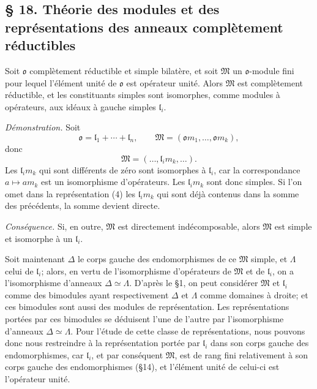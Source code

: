 
\providecommand{\mo}{\mathfrak{o}}
\providecommand{\mM}{\mathfrak{M}}
\providecommand{\ml}{\mathfrak{l}}

\subsection*{\S{} 18. Théorie des modules et des représentations des anneaux complètement réductibles}
Soit $\mo$ complètement réductible et simple bilatère, et soit $\mM$ un $\mo$-module fini pour lequel l'élément unité de $\mo$ est opérateur unité. Alors $\mM$ est complètement réductible, et les constituants simples sont isomorphes, comme modules à opérateurs, aux idéaux à gauche simples $\ml_i$.

\emph{Démonstration.} Soit
\[
        \mo=\ml_1+\cdots+\ml_n,
        \qquad
        \mM=(\mo m_1,\ldots,\mo m_k),
\]
donc
\[
        \mM=(\ldots,\ml_i m_k,\ldots).                     \tag{4}
\]
Les $\ml_i m_k$ qui sont différents de zéro sont isomorphes à $\ml_i$, car la correspondance $a\mapsto am_k$ est un isomorphisme d'opérateurs. Les $\ml_i m_k$ sont donc simples. Si l'on omet dans la représentation (4) les $\ml_i m_k$ qui sont déjà contenus dans la somme des précédents, la somme devient directe.

\emph{Conséquence.} Si, en outre, $\mM$ est directement indécomposable, alors $\mM$ est simple et isomorphe à un $\ml_i$.

Soit maintenant $\Delta$ le corps gauche des endomorphismes de ce $\mM$ simple, et $\Lambda$ celui de $\ml_i$; alors, en vertu de l'isomorphisme d'opérateurs de $\mM$ et de $\ml_i$, on a l'isomorphisme d'anneaux $\Delta\simeq\Lambda$. D'après le \S{}1, on peut considérer $\mM$ et $\ml_i$ comme des bimodules ayant respectivement $\Delta$ et $\Lambda$ comme domaines à droite; et ces bimodules sont aussi des modules de représentation. Les représentations portées par ces bimodules se déduisent l'une de l'autre par l'isomorphisme d'anneaux $\Delta\simeq\Lambda$. Pour l'étude de cette classe de représentations, nous pouvons donc nous restreindre à la représentation portée par $\ml_i$ dans son corps gauche des endomorphismes, car $\ml_i$, et par conséquent $\mM$, est de rang fini relativement à son corps gauche des endomorphismes (\S{}14), et l'élément unité de celui-ci est l'opérateur unité.

